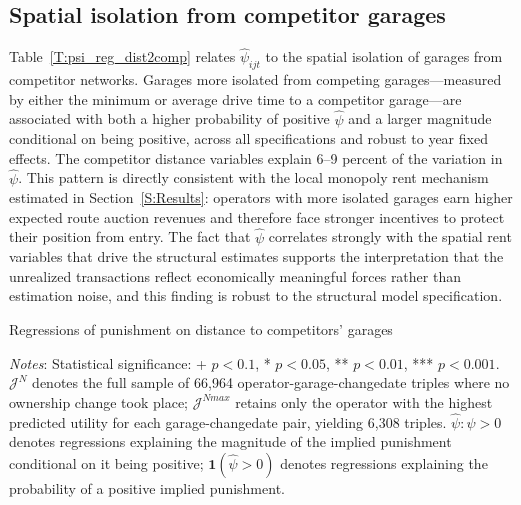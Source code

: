 \documentclass[12pt]{article}
\newcommand{\rootdir}{..}  %
\newcommand{\tables}{\rootdir/\rootdir/Output/tables}
\newcommand\fnote[1]{\captionsetup{font=small}\caption*{\emph{Notes}: #1}} %
\begin{document}
\subsection*{Spatial isolation from competitor garages}

Table~\ref{T:psi_reg_dist2comp} relates $\hat{\psi}_{ijt}$ to the spatial 
isolation of garages from competitor networks. Garages more isolated from 
competing garages---measured by either the minimum or average drive time to 
a competitor garage---are associated with both a higher probability of 
positive $\hat{\psi}$ and a larger magnitude conditional on being positive, 
across all specifications and robust to year fixed effects. The competitor 
distance variables explain 6--9 percent of the variation in $\hat{\psi}$. 
This pattern is directly consistent with the local monopoly rent mechanism 
estimated in Section~\ref{S:Results}: operators with more isolated garages 
earn higher expected route auction revenues and therefore face stronger 
incentives to protect their position from entry. The fact that $\hat{\psi}$ 
correlates strongly with the spatial rent variables that drive the structural 
estimates supports the interpretation that the unrealized transactions reflect 
economically meaningful forces rather than estimation noise, and this finding 
is robust to the structural model specification.

\begin{table}[!tb]
\centering
\caption{Regressions of punishment on distance to competitors' 
garages\label{T:psi_reg_dist2comp}}
\begin{adjustbox}{max width = \textwidth}

\end{adjustbox}
\fnote{Statistical significance: + $p<0.1$, * $p<0.05$, ** $p<0.01$, 
*** $p<0.001$. $\mathcal{J}^{N}$ denotes the full sample of 66,964 
operator-garage-changedate triples where no ownership change took place; 
$\mathcal{J}^{Nmax}$ retains only the operator with the highest predicted 
utility for each garage-changedate pair, yielding 6,308 triples. 
$\hat{\psi}:\hat{\psi}>0$ denotes regressions explaining the magnitude of the implied 
punishment conditional on it being positive; $\mathbf{1}(\hat{\psi}>0)$ denotes 
regressions explaining the probability of a positive implied punishment.}
\end{table}
\end{document}
